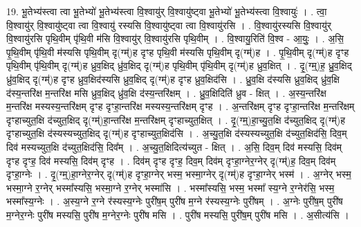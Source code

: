 \documentclass[17pt]{extarticle}
\begin{document}
19. भू॒तेभ्य॑स्त्वा त्वा भू॒तेभ्यो॑ भू॒तेभ्य॑स्त्वा वि॒श्वायु॑र् वि॒श्वायु॑ष्ट्वा भू॒तेभ्यो॑ भू॒तेभ्य॑स्त्वा वि॒श्वायुः॑ । . त्वा॒ वि॒श्वायु॑र् वि॒श्वायु॑ष्ट्वा त्वा वि॒श्वायु॑ रस्यसि वि॒श्वायु॑ष्ट्वा त्वा वि॒श्वायु॑रसि । . वि॒श्वायु॑रस्यसि वि॒श्वायु॑र् वि॒श्वायु॑रसि पृथि॒वीम् पृ॑थि॒वी म॑सि वि॒श्वायु॑र् वि॒श्वायु॑रसि पृथि॒वीम् । . वि॒श्वायु॒रिति॑ वि॒श्व - आ॒युः॒ । . अ॒सि॒ पृ॒थि॒वीम् पृ॑थि॒वी म॑स्यसि पृथि॒वीम् दृ(ग्म्॑)ह दृꣳह पृथि॒वी म॑स्यसि पृथि॒वीम् दृ(ग्म्॑)ह । . पृ॒थि॒वीम् दृ(ग्म्॑)ह दृꣳह पृथि॒वीम् पृ॑थि॒वीम् दृ(ग्म्॑)ह ध्रुव॒क्षिद् ध्रु॑व॒क्षिद् दृ(ग्म्॑)ह पृथि॒वीम् पृ॑थि॒वीम् दृ(ग्म्॑)ह ध्रुव॒क्षित् । . दृ॒(ग्म्॒)ह॒ ध्रु॒व॒क्षिद् ध्रु॑व॒क्षिद् दृ(ग्म्॑)ह दृꣳह ध्रुव॒क्षिद॑स्यसि ध्रुव॒क्षिद् दृ(ग्म्॑)ह दृꣳह ध्रुव॒क्षिद॑सि । . ध्रु॒व॒क्षि द॑स्यसि ध्रुव॒क्षिद् ध्रु॑व॒क्षि द॑स्य॒न्तरि॑क्ष म॒न्तरि॑क्ष मसि ध्रुव॒क्षिद् ध्रु॑व॒क्षि द॑स्य॒न्तरि॑क्षम् । . ध्रु॒व॒क्षिदिति॑ ध्रुव - क्षित् । . अ॒स्य॒न्तरि॑क्ष म॒न्तरि॑क्ष मस्यस्य॒न्तरि॑क्षम् दृꣳह दृꣳहा॒न्तरि॑क्ष मस्यस्य॒न्तरि॑क्षम् दृꣳह । . अ॒न्तरि॑क्षम् दृꣳह दृꣳहा॒न्तरि॑क्ष म॒न्तरि॑क्षम् दृꣳहाच्युत॒क्षि द॑च्युत॒क्षिद् दृ(ग्म्॑)हा॒न्तरि॑क्ष म॒न्तरि॑क्षम् दृꣳहाच्युत॒क्षित् । . दृ॒(ग्म्॒)हा॒च्यु॒त॒क्षि द॑च्युत॒क्षिद् दृ(ग्म्॑)ह दृꣳहाच्युत॒क्षि द॑स्यस्यच्युत॒क्षिद् दृ(ग्म्॑)ह दृꣳहाच्युत॒क्षिद॑सि । . अ॒च्यु॒त॒क्षि द॑स्यस्यच्युत॒क्षि द॑च्युत॒क्षिद॑सि॒ दिव॒म् दिव॑ मस्यच्युत॒क्षि द॑च्युत॒क्षिद॑सि॒ दिव᳚म् । . अ॒च्यु॒त॒क्षिदित्य॑च्युत - क्षित् । . अ॒सि॒ दिव॒म् दिव॑ मस्यसि॒ दिव॑म् दृꣳह दृꣳह॒ दिव॑ मस्यसि॒ दिव॑म् दृꣳह । . दिव॑म् दृꣳह दृꣳह॒ दिव॒म् दिव॑म् दृꣳहा॒ग्नेर॒ग्नेर् दृ(ग्म्॑)ह॒ दिव॒म् दिव॑म् दृꣳहा॒ग्नेः । . दृ॒(ग्म्॒)हा॒ग्नेर॒ग्नेर् दृ(ग्म्॑)ह दृꣳहा॒ग्नेर् भस्म॒ भस्मा॒ग्नेर् दृ(ग्म्॑)ह दृꣳहा॒ग्नेर् भस्म॑ । . अ॒ग्नेर् भस्म॒ भस्मा॒ग्ने र॒ग्नेर् भस्मा᳚स्यसि॒ भस्मा॒ग्ने र॒ग्नेर् भस्मा॑सि । . भस्मा᳚स्यसि॒ भस्म॒ भस्मा᳚ स्य॒ग्ने र॒ग्नेर॑सि॒ भस्म॒ भस्मा᳚स्य॒ग्नेः । . अ॒स्य॒ग्ने र॒ग्ने र॑स्यस्य॒ग्नेः पुरी॑ष॒म् पुरी॑ष म॒ग्ने र॑स्यस्य॒ग्नेः पुरी॑षम् । . अ॒ग्नेः पुरी॑ष॒म् पुरी॑ष म॒ग्नेर॒ग्नेः पुरी॑ष मस्यसि॒ पुरी॑ष म॒ग्नेर॒ग्नेः पुरी॑ष मसि । . पुरी॑ष मस्यसि॒ पुरी॑ष॒म् पुरी॑ष मसि । . अ॒सीत्य॑सि । \newline
\pagebreak
{}
\end{document}
